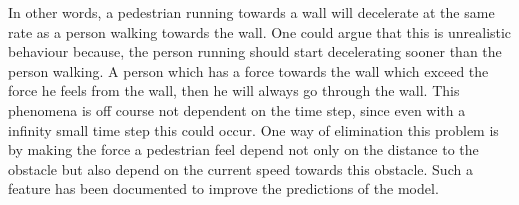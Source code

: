 In other words, a pedestrian running towards a wall will decelerate at the same rate as a person walking towards the wall. One could argue that this is unrealistic behaviour because, the person running should start decelerating sooner than the person walking. A person which has a force towards the wall which exceed the force he feels from the wall, then he will always go through the wall. This phenomena is off course not dependent on the time step, since even with a infinity small time step this could occur. One way of elimination this problem is by making the force a pedestrian feel depend not only on the distance to the obstacle but also depend on the current speed towards this obstacle. Such a feature has been documented to improve the predictions of the model\cite{ABconstant}.
\begin{figure}
\centering
{}

\end{figure}
